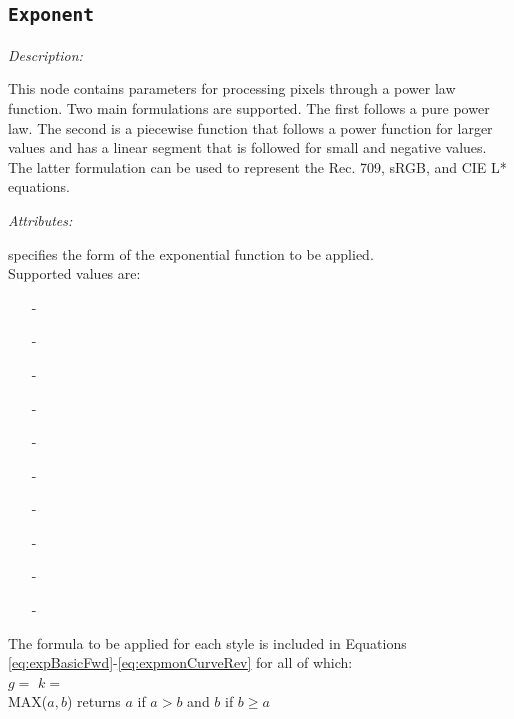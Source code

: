 \subsection{\texttt{Exponent}}

\emph{Description:} \par
This node contains parameters for processing pixels through a power law function. Two main formulations are supported. The first follows a pure power law. The second is a piecewise function that follows a power function for larger values and has a linear segment that is followed for small and negative values. The latter formulation can be used to represent the Rec. 709, sRGB, and CIE L* equations.

\emph{Attributes:}
\begin{xmlfields}
	\xmlitem[style][required] specifies the form of the exponential function to be applied.\\
	    Supported values are: 
	    	\begin{itemize}
                \item[-] 
                \item[-] 
                \item[-] 
                \item[-] 
                \item[-] 
                \item[-] 
                \item[-] 
                \item[-] 
                \item[-] 
                \item[-] 
            \end{itemize}

		The formula to be applied for each style is included in Equations \ref{eq:expBasicFwd}-\ref{eq:expmonCurveRev} for all of which: \\[10pt]
        \tabto{0.75in} $g =$  \tabto {2in} $k =$ \\[10pt]
        \tabto{0.75in} MAX(${a,b}$) returns $a$ if $a > b$ and $b$ if $b \geq a$


\end{xmlfields}
